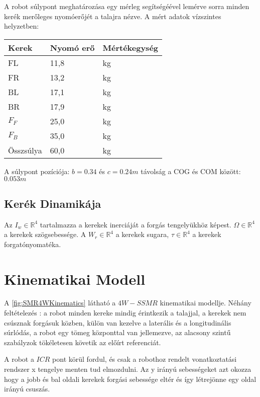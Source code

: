 A robot súlypont meghatározása egy mérleg segítségéével lemérve sorra minden kerék merőleges nyomóerőjét a talajra nézve. 
A mért adatok vízszintes helyzetben:

\begin{table}[H]
\center
\begin{tabular}{lll}
 \hline Kerek  & Nyomó erő & Mértékegység \\ \hline
FL &   11,8      & kg          \\
FR &   13,2      & kg          \\
BL &   17,1      & kg          \\
BR &   17,9      & kg          \\ 
$F_F$ &   25,0      & kg          \\ 
$F_B$ &   35,0      & kg          \\ 
Összsúlya &   60,0   & kg
\end{tabular}
\end{table}

A súlypont pozíciója: $b = 0.34$ és $c = 0.24m $ távolság a COG és COM között: $0.053m$

\subsection{Kerék Dinamikája}
Az $I_w \in \mathbb{R}^4$ tartalmazza a kerekek inerciáját a forgás tengelyükhöz képest. $\Omega \in \mathbb{R}^4$ a kerekek szögsebessége. A $W_r \in \mathbb{R}^4$ a kerekek sugara, $\tau \in \mathbb{R}^4$ a kerekek forgatónyomatéka.




\section{Kinematikai Modell} 

A \ref{fig:SMR4WKinematics} látható a $4W-SSMR$ kinematikai modellje. Néhány feltételezés : a robot minden kereke mindig érintkezik a talajjal, a kerekek nem csúsznak forgásuk közben, külön van kezelve a laterális és a longitudinális súrlódás, a robot egy tömeg központtal van jellemezve, az alacsony szintű szabályzok tökéletesen követik az előírt referenciát.

A robot a $ICR$ pont körül fordul, és csak a robothoz rendelt vonatkoztatási rendszer x tengelye menten tud elmozdulni. Az y irányú sebességeket azt okozza hogy a jobb és bal oldali kerekek forgási sebessége eltér és így létrejönne egy oldal irányú csuszás. 

